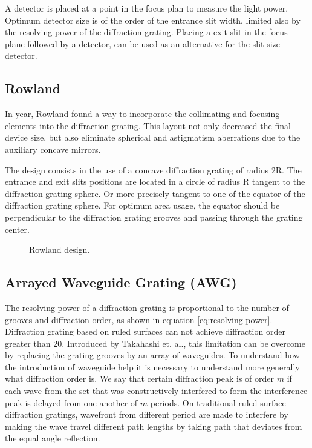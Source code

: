 \documentclass[12pt,twoside,english]{book}
\renewcommand{\~}{\perispomeni}%
\numberwithin{equation}{section}
\numberwithin{figure}{section}
\begin{document}
A detector is placed at a point in the focus plan to measure the light power. Optimum detector size is of the order of the entrance slit width, limited also by the resolving power of the diffraction grating. Placing a exit slit in the focus plane followed by a detector, can be used as an alternative for the slit size detector. 

\subsection{Rowland\label{sub:Rowland}}

In year, Rowland \cite{Rowland:1883p38} found a way to incorporate the collimating and focusing elements into the diffraction grating. This layout not only decreased the final device size, but also eliminate spherical and astigmatism aberrations due to the auxiliary concave mirrors.

The design consists in the use of a concave diffraction grating of radius 2R. The entrance and exit slits positions are located in a circle of radius R tangent to the diffraction grating sphere. Or more precisely tangent to one of the equator of the diffraction grating sphere. For optimum area usage, the equator should be perpendicular to the diffraction grating grooves and passing through the grating center.

%
\begin{figure}[h]
\center{}
\caption{Rowland design.}
\end{figure}



\subsection{Arrayed Waveguide Grating (AWG)}

The resolving power of a diffraction grating is proportional to the number of grooves and diffraction order, as shown in equation \ref{eq:resolving power}. Diffraction grating based on ruled surfaces can not achieve diffraction order greater than 20. Introduced by Takahashi et. al.\cite{Takahashi:1990p122}, this limitation can be overcome by replacing the grating grooves by an array of waveguides. To understand how the introduction of waveguide help it is necessary to understand more generally what diffraction order is. We say that certain diffraction peak is of order $m$ if each wave from the set that was constructively interfered to form the interference peak is delayed from one another of $m$ periods. On traditional ruled surface diffraction gratings, wavefront from different period are made to interfere by making the wave travel different path lengths by taking path that deviates from the equal angle reflection.
\end{document}
